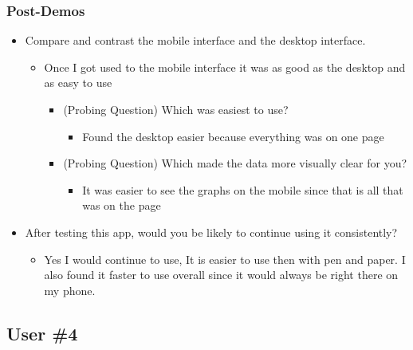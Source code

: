 \documentclass{chi2011}
\begin{document}
	\subsubsection{Post-Demos}
	\begin{itemize}[noitemsep]
		\item Compare and contrast the mobile interface and the desktop interface.
		\begin{itemize}[noitemsep]
				\item Once I got used to the mobile interface it was as good as
					the desktop and as easy to use
			\begin{itemize}[noitemsep]
				\item (Probing Question) Which was easiest to use?
				\begin{itemize}[noitemsep]
					\item Found the desktop easier because everything was on one
						page
				\end{itemize}
			\item (Probing Question) Which made the data more visually clear for you?
				\begin{itemize}[noitemsep]
					\item It was easier to see the graphs on the mobile since
						that is all that was on the page
				\end{itemize}
			\end{itemize}
		\end{itemize}

		\item After testing this app, would you be likely to continue using it consistently? 
		\begin{itemize}[noitemsep]
				\item Yes I would continue to use, It is easier to use then with
					pen and paper. I also found it faster to use overall since
					it would always be right there on my phone.
		\end{itemize}
	\end{itemize}
	
	
	\subsection{User \#4}
\end{document}
